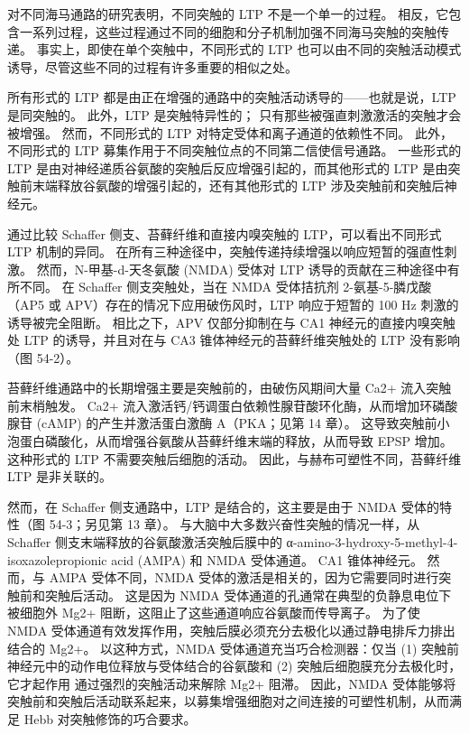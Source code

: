 对不同海马通路的研究表明，不同突触的 LTP 不是一个单一的过程。 相反，它包含一系列过程，这些过程通过不同的细胞和分子机制加强不同海马突触的突触传递。 事实上，即使在单个突触中，不同形式的 LTP 也可以由不同的突触活动模式诱导，尽管这些不同的过程有许多重要的相似之处。

所有形式的 LTP 都是由正在增强的通路中的突触活动诱导的——也就是说，LTP 是同突触的。 此外，LTP 是突触特异性的； 只有那些被强直刺激激活的突触才会被增强。 然而，不同形式的 LTP 对特定受体和离子通道的依赖性不同。 此外，不同形式的 LTP 募集作用于不同突触位点的不同第二信使信号通路。 一些形式的 LTP 是由对神经递质谷氨酸的突触后反应增强引起的，而其他形式的 LTP 是由突触前末端释放谷氨酸的增强引起的，还有其他形式的 LTP 涉及突触前和突触后神经元。

通过比较 Schaffer 侧支、苔藓纤维和直接内嗅突触的 LTP，可以看出不同形式 LTP 机制的异同。 在所有三种途径中，突触传递持续增强以响应短暂的强直性刺激。 然而，N-甲基-d-天冬氨酸 (NMDA) 受体对 LTP 诱导的贡献在三种途径中有所不同。 在 Schaffer 侧支突触处，当在 NMDA 受体拮抗剂 2-氨基-5-膦戊酸（AP5 或 APV）存在的情况下应用破伤风时，LTP 响应于短暂的 100 Hz 刺激的诱导被完全阻断。 相比之下，APV 仅部分抑制在与 CA1 神经元的直接内嗅突触处 LTP 的诱导，并且对在与 CA3 锥体神经元的苔藓纤维突触处的 LTP 没有影响（图 54-2）。

苔藓纤维通路中的长期增强主要是突触前的，由破伤风期间大量 Ca2+ 流入突触前末梢触发。 Ca2+ 流入激活钙/钙调蛋白依赖性腺苷酸环化酶，从而增加环磷酸腺苷 (cAMP) 的产生并激活蛋白激酶 A（PKA；见第 14 章）。 这导致突触前小泡蛋白磷酸化，从而增强谷氨酸从苔藓纤维末端的释放，从而导致 EPSP 增加。 这种形式的 LTP 不需要突触后细胞的活动。 因此，与赫布可塑性不同，苔藓纤维 LTP 是非关联的。

然而，在 Schaffer 侧支通路中，LTP 是结合的，这主要是由于 NMDA 受体的特性（图 54-3；另见第 13 章）。 与大脑中大多数兴奋性突触的情况一样，从 Schaffer 侧支末端释放的谷氨酸激活突触后膜中的 α-amino-3-hydroxy-5-methyl-4-isoxazolepropionic acid (AMPA) 和 NMDA 受体通道。 CA1 锥体神经元。 然而，与 AMPA 受体不同，NMDA 受体的激活是相关的，因为它需要同时进行突触前和突触后活动。 这是因为 NMDA 受体通道的孔通常在典型的负静息电位下被细胞外 Mg2+ 阻断，这阻止了这些通道响应谷氨酸而传导离子。 为了使 NMDA 受体通道有效发挥作用，突触后膜必须充分去极化以通过静电排斥力排出结合的 Mg2+。 以这种方式，NMDA 受体通道充当巧合检测器：仅当 (1) 突触前神经元中的动作电位释放与受体结合的谷氨酸和 (2) 突触后细胞膜充分去极化时，它才起作用 通过强烈的突触活动来解除 Mg2+ 阻滞。 因此，NMDA 受体能够将突触前和突触后活动联系起来，以募集增强细胞对之间连接的可塑性机制，从而满足 Hebb 对突触修饰的巧合要求。

